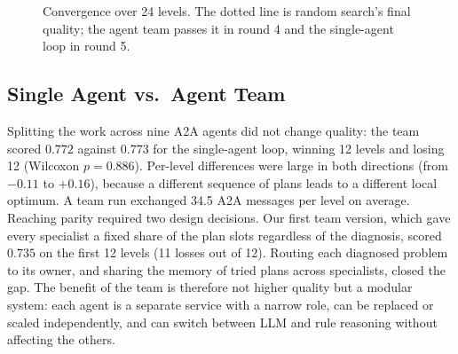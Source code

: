 \documentclass[conference]{IEEEtran}
\begin{document}
\begin{figure}[t]
\centering
{}
\caption{Convergence over 24 levels. The dotted line is random search's final quality; the agent
team passes it in round 4 and the single-agent loop in round 5.}
\label{fig:conv}
\end{figure}

\subsection{Single Agent vs.\ Agent Team}
Splitting the work across nine A2A agents did not change quality: the team scored $0.772$ against
$0.773$ for the single-agent loop, winning 12 levels and losing 12 (Wilcoxon $p=0.886$). Per-level
differences were large in both directions (from $-0.11$ to $+0.16$), because a different sequence of
plans leads to a different local optimum. A team run exchanged 34.5 A2A messages per level on average.
Reaching parity required two design decisions. Our first team version, which gave every specialist
a fixed share of the plan slots regardless of the diagnosis, scored $0.735$ on the first 12 levels
(11 losses out of 12). Routing each diagnosed problem to its owner, and sharing the memory of tried
plans across specialists, closed the gap. The benefit of the team is therefore not higher quality
but a modular system: each agent is a separate service with a narrow role, can be replaced or
scaled independently, and can switch between LLM and rule reasoning without affecting the others.
\end{document}
